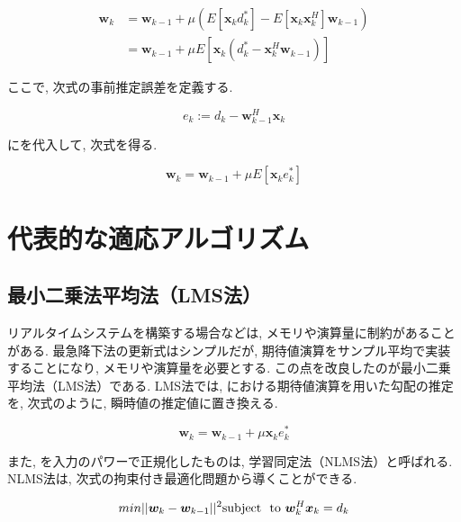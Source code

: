 \begin{equation}
\begin{split}
\bm{w}_k &= \bm{w}_{k-1} + \mu (E[\bm{x}_k d_k^*] - E[\bm{x}_k \bm{x}_k^H] \bm{w}_{k-1}) \\
         &= \bm{w}_{k-1} + \mu E[\bm{x}_k (d_k^* - \bm{x}_k^H \bm{w}_{k-1})]
\end{split}
\label{equ:w_complex}
\end{equation}

ここで, 次式の事前推定誤差を定義する. 

\begin{equation}
e_k := d_k - \bm{w}_{k-1}^H \bm{x}_k
\label{equ:prior_estimation_error}
\end{equation}

にを代入して, 次式を得る. 

\begin{equation}
\bm{w}_k = \bm{w}_{k-1} + \mu E[\bm{x}_k e_k^*]
\label{equ:w_update_sd}
\end{equation}


\section{代表的な適応アルゴリズム}\label{main-algo}

\subsection{最小二乗法平均法（LMS法）}\label{lms}

リアルタイムシステムを構築する場合などは, メモリや演算量に制約があることがある. 最急降下法の更新式はシンプルだが, 期待値演算をサンプル平均で実装することになり, メモリや演算量を必要とする. この点を改良したのが最小二乗平均法（LMS法）である. LMS法では, における期待値演算を用いた勾配の推定を, 次式のように, 瞬時値の推定値に置き換える. 

\begin{equation}
\bm{w}_k = \bm{w}_{k-1} + \mu \bm{x}_k e_k^*
\label{equ:w_update_lms_simple}
\end{equation}

また, を入力のパワーで正規化したものは, 学習同定法（NLMS法）と呼ばれる. NLMS法は, 次式の拘束付き最適化問題から導くことができる. 

\begin{equation}
min ||\bm{w}_k - \bm{w}_{k-1}||^2 \\
\mbox{subject \ to} \ \bm{w}_k^H \bm{x}_k = d_k
\end{equation}

